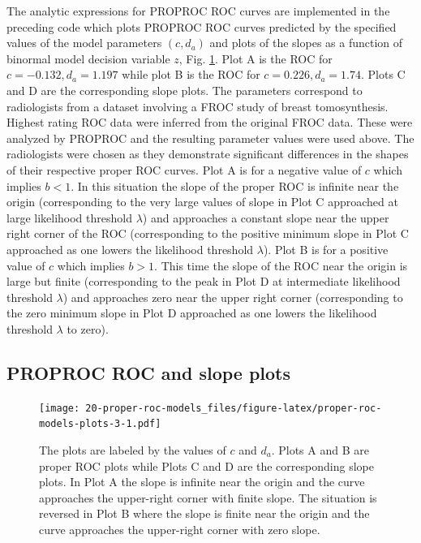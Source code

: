 \documentclass[
]{book}
\begin{document}
The analytic expressions for PROPROC ROC curves are implemented in the preceding code which plots PROPROC ROC curves predicted by the specified values of the model parameters \((c,d_a)\) and plots of the slopes as a function of binormal model decision variable \(z\), Fig. \ref{fig:proper-roc-models-plots-3}. Plot A is the ROC for \(c = -0.132, d_a = 1.197\) while plot B is the ROC for \(c = 0.226, d_a = 1.74\). Plots C and D are the corresponding slope plots. The parameters correspond to radiologists from a dataset \citep{andersson2008breast} involving a FROC study of breast tomosynthesis. Highest rating ROC data were inferred from the original FROC data. These were analyzed by PROPROC and the resulting parameter values were used above. The radiologists were chosen as they demonstrate significant differences in the shapes of their respective proper ROC curves. Plot A is for a negative value of \(c\) which implies \(b < 1\). In this situation the slope of the proper ROC is infinite near the origin (corresponding to the very large values of slope in Plot C approached at large likelihood threshold \(\lambda\)) and approaches a constant slope near the upper right corner of the ROC (corresponding to the positive minimum slope in Plot C approached as one lowers the likelihood threshold \(\lambda\)). Plot B is for a positive value of \(c\) which implies \(b > 1\). This time the slope of the ROC near the origin is large but finite (corresponding to the peak in Plot D at intermediate likelihood threshold \(\lambda\)) and approaches zero near the upper right corner (corresponding to the zero minimum slope in Plot D approached as one lowers the likelihood threshold \(\lambda\) to zero).

\hypertarget{proper-roc-models-proproc-rocs}{%
\subsection{PROPROC ROC and slope plots}\label{proper-roc-models-proproc-rocs}}

\begin{figure}
\centering
\texttt{[image: 20-proper-roc-models\_files/figure-latex/proper-roc-models-plots-3-1.pdf]}
\caption{\label{fig:proper-roc-models-plots-3}The plots are labeled by the values of \(c\) and \(d_a\). Plots A and B are proper ROC plots while Plots C and D are the corresponding slope plots. In Plot A the slope is infinite near the origin and the curve approaches the upper-right corner with finite slope. The situation is reversed in Plot B where the slope is finite near the origin and the curve approaches the upper-right corner with zero slope.}
\end{figure}
\end{document}
